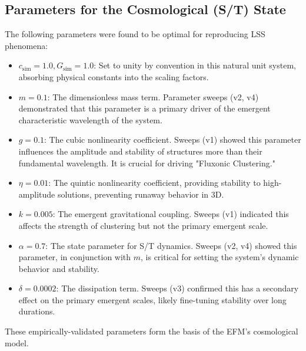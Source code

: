 \documentclass[11pt]{article}
\begin{document}
\subsection{Parameters for the Cosmological (S/T) State}
The following parameters were found to be optimal for reproducing LSS phenomena:
\begin{itemize}
    \item \textbf{$c_{\text{sim}} = 1.0, G_{\text{sim}} = 1.0$}: Set to unity by convention in this natural unit system, absorbing physical constants into the scaling factors.
    \item \textbf{$m = 0.1$}: The dimensionless mass term. Parameter sweeps (v2, v4) demonstrated that this parameter is a primary driver of the emergent characteristic wavelength of the system.
    \item \textbf{$g = 0.1$}: The cubic nonlinearity coefficient. Sweeps (v1) showed this parameter influences the amplitude and stability of structures more than their fundamental wavelength. It is crucial for driving "Fluxonic Clustering."
    \item \textbf{$\eta = 0.01$}: The quintic nonlinearity coefficient, providing stability to high-amplitude solutions, preventing runaway behavior in 3D.
    \item \textbf{$k = 0.005$}: The emergent gravitational coupling. Sweeps (v1) indicated this affects the strength of clustering but not the primary emergent scale.
    \item \textbf{$\alpha = 0.7$}: The state parameter for S/T dynamics. Sweeps (v2, v4) showed this parameter, in conjunction with $m$, is critical for setting the system’s dynamic behavior and stability.
    \item \textbf{$\delta = 0.0002$}: The dissipation term. Sweeps (v3) confirmed this has a secondary effect on the primary emergent scales, likely fine-tuning stability over long durations.
\end{itemize}
These empirically-validated parameters form the basis of the EFM’s cosmological model.
\end{document}
